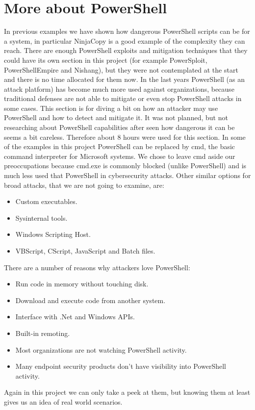 \section{More about PowerShell}
In previous examples we have shown how dangerous PowerShell scripts can be for a system, in particular NinjaCopy is a good example of the complexity they can reach.
\linej
There are enough PowerShell exploits and mitigation techniques that they could have its own section in this project (for example PowerSploit, PowerShellEmpire and Nishang), but they were not contemplated at the start and there is no time allocated for them now.
In the last years PowerShell (as an attack platform) has become much more used against organizations, because traditional defenses are not able to mitigate or even stop PowerShell attacks in some cases.
\linej
This section is for diving a bit on how an attacker may use PowerShell and how to detect and mitigate it. It was not planned, but not researching about PowerShell capabilities after seen how dangerous it can be seems a bit careless. Therefore about 8 hours were used for this section.
\linej
\linej
In some of the examples in this project PowerShell can be replaced by cmd, the basic command interpreter for Microsoft systems.
We chose to leave cmd aside our preoccupations because cmd.exe is commonly blocked (unlike PowerShell) and is much less used that PowerShell in cybersecurity attacks.
\linej
\linej
Other similar options for broad attacks, that we are not going to examine, are\cite{powershell_adsecurity}:
\begin{itemize}
\item Custom executables.
\item Sysinternal tools.
\item Windows Scripting Host.
\item VBScript, CScript, JavaScript and Batch files.
\end{itemize}
\linej
There are a number of reasons why attackers love PowerShell\cite{powershell_adsecurity}:
\begin{itemize}
\item Run code in memory without touching disk.
\item Download and execute code from another system.
\item Interface with .Net and Windows APIs.
\item Built-in remoting.
\item Most organizations are not watching PowerShell activity.
\item Many endpoint security products don’t have visibility into PowerShell activity.
\end{itemize}
\linej
Again in this project we can only take a peek at them, but knowing them at least gives us an idea of real world scenarios.

